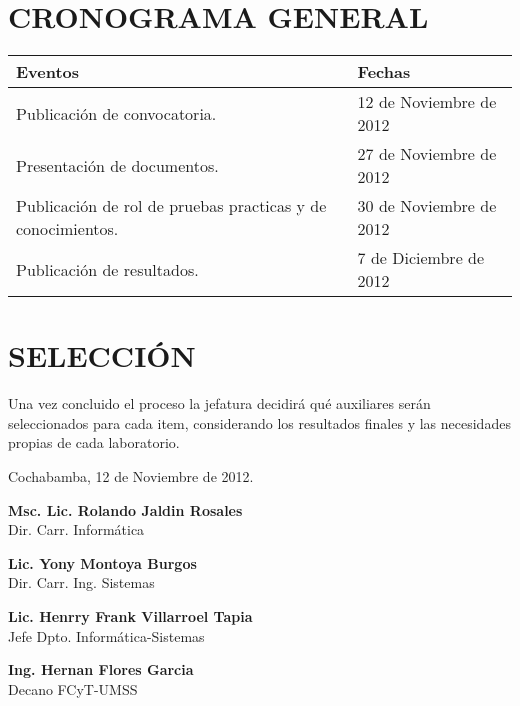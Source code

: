 \documentclass[letterpaper,11pt]{article}
\begin{document}
\section{CRONOGRAMA GENERAL}
\begin{tabular}{|l|l|}
\hline
 \textbf{Eventos} & \textbf{Fechas} \\
\hline
 Publicación de convocatoria. & 12 de Noviembre de 2012 \\
\hline
 Presentación de documentos. & 27 de Noviembre de 2012 \\
\hline
 Publicación de rol de pruebas practicas y de conocimientos. & 30 de Noviembre de 2012 \\
\hline
 Publicación de resultados. & 7 de Diciembre de 2012 \\
\hline
\end{tabular}

\section{SELECCIÓN}
Una vez concluido el proceso la jefatura decidirá qué auxiliares serán seleccionados para cada item, considerando los resultados finales y las necesidades propias de cada laboratorio.

\vspace{4cm}

\begin{center}
Cochabamba, 12 de Noviembre de 2012.
\end{center}

\vspace{4cm}

\begin{minipage}[b]{0.5\textwidth}
\begin{center}
{\bf Msc. Lic. Rolando Jaldin Rosales}\\
Dir. Carr. Informática\\
\end{center}
\end{minipage}
\begin{minipage}[b]{0.5\textwidth}
\begin{center}
{\bf Lic. Yony Montoya Burgos}\\
Dir. Carr. Ing. Sistemas\\
\end{center}
\end{minipage}

\vspace{4cm}

\begin{minipage}[b]{0.5\textwidth}
\begin{center}
{\bf Lic. Henrry Frank Villarroel Tapia}\\
Jefe Dpto. Informática-Sistemas\\
\end{center}
\end{minipage}
\begin{minipage}[b]{0.5\textwidth}
\begin{center}
{\bf Ing. Hernan Flores Garcia}\\
Decano FCyT-UMSS\\
\end{center}
\end{minipage}
\end{document}
